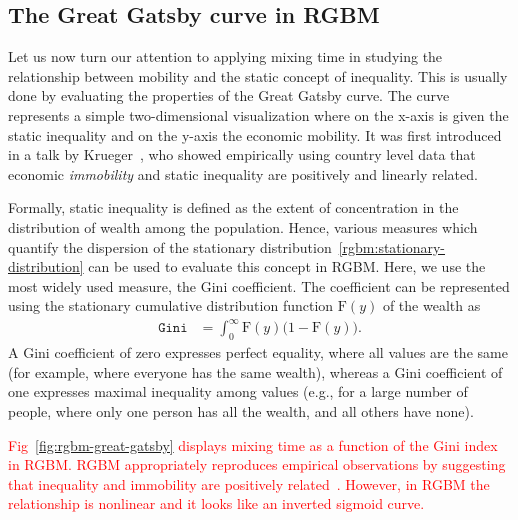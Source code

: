 \documentclass[11pt]{article}
\numberwithin{equation}{section}
\begin{document}
\subsection{The Great Gatsby curve in RGBM}

Let us now turn our attention to applying mixing time in studying the relationship between mobility and the static concept of inequality. This is usually done by evaluating the properties of the Great Gatsby curve. The curve represents a simple two-dimensional visualization where on the x-axis is given the static inequality and on the y-axis the economic mobility. It was first introduced in a talk by Krueger~\cite{krueger2012rise}, who showed empirically using country level data that economic \textit{immobility} and static inequality are  positively and linearly related.

Formally, static inequality is defined as the extent of concentration in the distribution of wealth among the population. Hence, various measures which quantify the dispersion of the stationary distribution~\eqref{rgbm:stationary-distribution} can be used to evaluate this concept in RGBM. Here, we use the most widely used measure, the Gini coefficient. The coefficient can be represented using the stationary cumulative distribution function $\mathrm{F}(y)$ of the wealth as
\begin{align}
\texttt{Gini} &= \int_0^{\infty} \mathrm{F}(y) \bigg( 1 - \mathrm{F}(y) \bigg).
\end{align}
A Gini coefficient of zero expresses perfect equality, where all values are the same (for example, where everyone has the same wealth), whereas a Gini coefficient of one expresses maximal inequality among values (e.g., for a large number of people, where only one person has all the wealth, and all others have none).

\textcolor{red}{Fig~\ref{fig:rgbm-great-gatsby} displays mixing time as a function of the Gini index in RGBM. RGBM appropriately reproduces empirical observations by suggesting that inequality and immobility are positively related~\citep{krueger2012}. However, in RGBM the relationship is nonlinear and it looks like an inverted sigmoid curve.}
\end{document}

